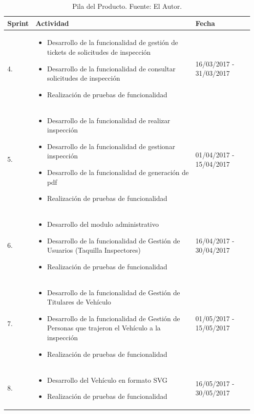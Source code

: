\begin{table}[H]	
\begin{center}
\begin{tabular}{ | m{2cm} | m{9cm}| m{3cm}| } 
 \hline
 Sprint & Actividad & Fecha \\
 \hline
 4.
 & 
 \begin{itemize}
 	\item Desarrollo de la funcionalidad de gestión de tickets de solicitudes de inspección
 	\item Desarrollo de la funcionalidad de consultar solicitudes de inspección
 	\item Realización de pruebas de funcionalidad
 \end{itemize}
 & 
 16/03/2017 - 31/03/2017\\
 \hline
  5. 
 & 
 \begin{itemize}
 	\item Desarrollo de la funcionalidad de realizar inspección
 	\item Desarrollo de la funcionalidad de gestionar inspección
 	\item Desarrollo de la funcionalidad de generación de pdf
 	\item Realización de pruebas de funcionalidad
 \end{itemize}
 & 
 01/04/2017 - 15/04/2017\\
 \hline
6. 
 & 
 \begin{itemize}
 	\item Desarrollo del modulo administrativo
 	\item Desarrollo de la funcionalidad de Gestión de Usuarios (Taquilla Inspectores)
 	\item Realización de pruebas de funcionalidad
 \end{itemize}
 & 
 16/04/2017 - 30/04/2017\\
 \hline

 7. 
 & 
 \begin{itemize}
 	\item Desarrollo de la funcionalidad de Gestión de Titulares de Vehículo
 	\item Desarrollo de la funcionalidad de Gestión de Personas que trajeron el Vehículo a la inspección
 	\item Realización de pruebas de funcionalidad
 \end{itemize}
 & 
 01/05/2017 - 15/05/2017\\
 \hline

 8.
 & 
 \begin{itemize}
 	\item Desarrollo del Vehículo en formato SVG
 	\item Realización de pruebas de funcionalidad
 \end{itemize}
 &
 16/05/2017 - 30/05/2017\\
 \hline

\end{tabular}
\caption{Pila del Producto. Fuente: El Autor.}
\label{Tabla:15}
\end{center}
\end{table}	





